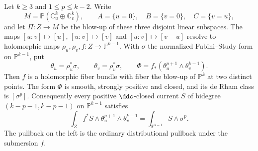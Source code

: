 \begin{lemma}\label{lem:third-projection-pairing}
Let $k\geq3$ and $1\leq p\leq k-2$. Write
\[
 M=\mathbb P(\mathbb C^k_u\oplus\mathbb C^k_v),\qquad
 A=\{u=0\},\quad B=\{v=0\},\quad C=\{v=u\},
\]
and let $\Pi:Z\to M$ be the blow-up of these three disjoint linear subspaces. The maps $[u:v]\mapsto[u]$, $[u:v]\mapsto[v]$ and $[u:v]\mapsto[v-u]$ resolve to holomorphic maps $\rho_u,\rho_v,f:Z\to\mathbb P^{k-1}$. With $\sigma$ the normalized Fubini--Study form on $\mathbb P^{k-1}$, put
\[
 \theta_u=\rho_u^*\sigma,\qquad \theta_v=\rho_v^*\sigma,
 \qquad \Phi=f_*(\theta_u^{p+1}\wedge\theta_v^{k-1}).
\]
Then $f$ is a holomorphic fiber bundle with fiber the blow-up of $\mathbb P^k$ at two distinct points. The form $\Phi$ is smooth, strongly positive and closed, and its de Rham class is $[\sigma^p]$. Consequently every positive $\ddc$-closed current $S$ of bidegree $(k-p-1,k-p-1)$ on $\mathbb P^{k-1}$ satisfies
\[
 \int_Z f^*S\wedge\theta_u^{p+1}\wedge\theta_v^{k-1}
 =\int_{\mathbb P^{k-1}}S\wedge\sigma^p.
\]
The pullback on the left is the ordinary distributional pullback under the submersion $f$.
\end{lemma}

